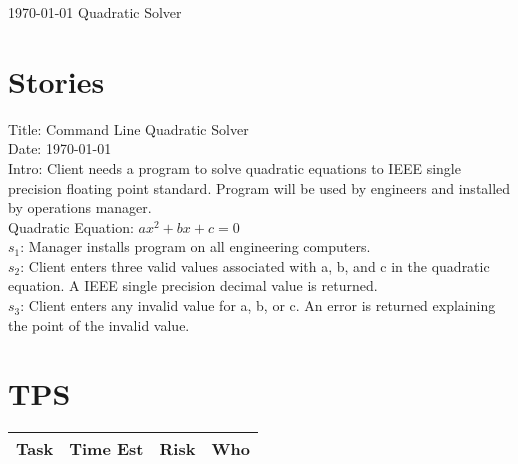 \documentclass[12pt]{article}
\begin{document}
\TabPositions{4cm}
 
\today {} Quadratic Solver\\
\section*{Stories}
Title: Command Line Quadratic Solver\\
Date: \today \\
Intro: Client needs a program to solve quadratic equations to IEEE single precision floating point standard. Program will be used by engineers and installed by operations manager.\\
Quadratic Equation: $ax^2 + bx + c = 0$\\

$s_1$: Manager installs program on all engineering computers.\\
$s_2$: Client enters three valid values associated with a, b, and c in the quadratic equation. A IEEE single precision decimal value is returned.\\
$s_3$: Client enters any invalid value for a, b, or c. An error is returned explaining the point of the invalid value.\\ 

\section*{TPS}
\begin{tabular}{c|c|c|c}
Task & Time Est & Risk & Who\\
\hline

\end{tabular}
\end{document}
